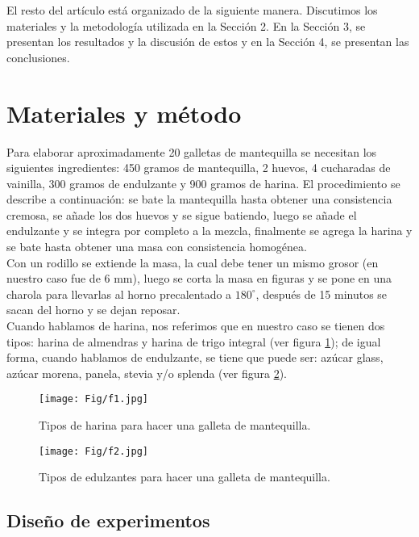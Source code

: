 \documentclass[spanish,letterpaper,12pt]{article}
\begin{document}
El resto del artículo está organizado de la siguiente manera. Discutimos los materiales y la metodología utilizada en la Sección 2. En la Sección 3, se presentan los resultados y la discusión de estos y en la Sección 4, se presentan las conclusiones.


\section{Materiales y método}
\label{sec:desc}

Para elaborar aproximadamente 20 galletas de mantequilla se necesitan los siguientes ingredientes: 450 gramos de mantequilla, 2 huevos, 4 cucharadas de vainilla, 300 gramos de endulzante y 900 gramos de harina. El procedimiento se describe a continuación: se bate la mantequilla hasta obtener una consistencia cremosa, se añade los dos huevos y se sigue batiendo, luego se añade el endulzante y se integra por completo a la mezcla, finalmente se agrega la harina y se bate hasta obtener una masa con consistencia homogénea.\\

Con un rodillo se extiende la masa, la cual debe tener un mismo grosor (en nuestro caso fue de 6 mm), luego se corta la masa en figuras y se pone en una charola para llevarlas al horno precalentado a $180^\circ$, después de 15 minutos se sacan del horno y se dejan reposar.\\

Cuando hablamos de harina, nos referimos que en nuestro caso se tienen dos tipos: harina de almendras y harina de trigo  integral (ver figura \ref{f1}); de igual forma, cuando hablamos de endulzante, se tiene que puede ser: azúcar glass, azúcar morena, panela, stevia y/o splenda (ver figura \ref{f2}).
\begin{figure}[]
\begin{center}
\texttt{[image: Fig/f1.jpg]}
\caption{Tipos de harina para hacer una galleta de mantequilla.}\label{f1}
\end{center}
\end{figure}

\begin{figure}[]
\begin{center}
\texttt{[image: Fig/f2.jpg]}
\caption{Tipos de edulzantes para hacer una galleta de mantequilla.}\label{f2}
\end{center}
\end{figure}

\subsection{Diseño de experimentos}
\label{subsec:diseno}
\end{document}
